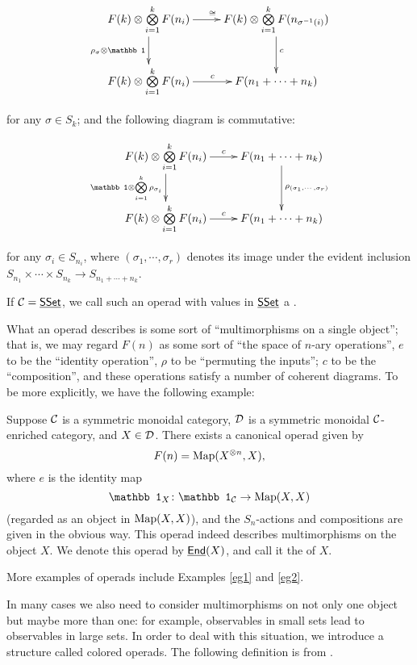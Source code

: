 \documentclass[twoside]{article}
\begin{document}
\begin{definition}
\begin{enumerate}[i)]
        \[\xymatrix{
        F(k)\ox\bigox_{i=1}^k F(n_i)\ar[r]^\cong\ar[d]_{\rho_\sigma\ox\mathbb1}&
        F(k)\ox\bigox_{i=1}^k F(n_{\sigma^{-1}(i)})\ar[d]^{c}\\
        F(k)\ox\bigox_{i=1}^k F(n_i)\ar[r]^c&F(n_1+\cdots+n_k)
        }\]
        
        for any $\sigma\in S_k$; and the following diagram is commutative:

        \[\xymatrix{F(k)\ox\bigox_{i=1}^k F(n_i)\ar[d]_{\mathbb1\ox
        \bigox_{i=1}^k\rho_{\sigma_i}}\ar[r]^c&F(n_1+\cdots+n_k)
        \ar[d]^{\rho_{(\sigma_1,\cdots,\sigma_r)}}\\F(k)\ox\bigox_{i=1}^k F(n_i)
        \ar[r]^c&F(n_1+\cdots+n_k)}\]
        
        for any $\sigma_i\in S_{n_i}$, where
        $(\sigma_1,\cdots,\sigma_r)$ denotes its image under the evident inclusion
        $S_{n_1}\times\cdots\times S_{n_k}\to S_{n_1+\cdots+n_k}$.
    \end{enumerate}
    If $\mathcal C=\underline{\smash{\mathsf{SSet}}}$, we call such an operad with values in $\underline{\smash{\mathsf{SSet}}}$
    a .
\end{definition}

What an operad describes is some sort of ``multimorphisms on a single object'';
that is, we may regard $F(n)$ as some sort of ``the space of $n$-ary operations'', 
$e$ to be the ``identity operation'', $\rho$ to be ``permuting the inputs'';
$c$ to be the ``composition'', and these operations satisfy a number of
coherent diagrams. To be more explicitly, we have the following example:

\begin{example}
    Suppose $\cal C$ is a symmetric monoidal category, $\cal D$ is a
    symmetric monoidal $\cal C$-enriched category, and $X\in\cal D$.
    There exists a canonical operad given by \[F(n)=\operatorname{Map}(X^{\otimes n},X),\]
    where $e$ is the identity map \[\mathbb1_X\:\mathbb1_{\cal C}\to\Map(X,X)\]
    (regarded as an object in $\operatorname{Map}(X,X)$), and the $S_n$-actions and 
    compositions are given in the obvious way. This operad indeed describes 
    multimorphisms on the object $X$. We denote this operad by $\underline{\mathsf{End}}(X)$,
    and call it the  of $X$.
\end{example}

More examples of operads include Examples \ref{eg1} and \ref{eg2}.

In many cases we also need to consider multimorphisms on not only
one object but maybe more than one: for example, observables in small sets
lead to observables in large sets. In order to deal with this situation,
we introduce a structure called colored operads. The following definition
is from \cite{nLab}.
\end{document}
